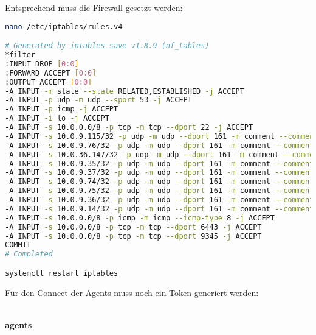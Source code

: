 Entsprechend muss die Firewall gesetzt werden:
\lstset{style=gra_codestyle}
\begin{lstlisting}[language=bash, caption=iptables entries server,captionpos=b,label={lst:iptables-server-entries},breaklines=true]
nano /etc/iptables/rules.v4

# Generated by iptables-save v1.8.9 (nf_tables)
*filter
:INPUT DROP [0:0]
:FORWARD ACCEPT [0:0]
:OUTPUT ACCEPT [0:0]
-A INPUT -m state --state RELATED,ESTABLISHED -j ACCEPT
-A INPUT -p udp -m udp --sport 53 -j ACCEPT
-A INPUT -p icmp -j ACCEPT
-A INPUT -i lo -j ACCEPT
-A INPUT -s 10.0.0.0/8 -p tcp -m tcp --dport 22 -j ACCEPT
-A INPUT -s 10.0.9.115/32 -p udp -m udp --dport 161 -m comment --comment "Allow SNMP for probe 10.0.9.115" -j ACCEPT
-A INPUT -s 10.0.9.76/32 -p udp -m udp --dport 161 -m comment --comment "Allow SNMP for probe 10.0.9.76" -j ACCEPT
-A INPUT -s 10.0.36.147/32 -p udp -m udp --dport 161 -m comment --comment "Allow SNMP for probe 10.0.36.147" -j ACCEPT
-A INPUT -s 10.0.9.35/32 -p udp -m udp --dport 161 -m comment --comment "Allow SNMP for probe 10.0.9.35" -j ACCEPT
-A INPUT -s 10.0.9.37/32 -p udp -m udp --dport 161 -m comment --comment "Allow SNMP for probe 10.0.9.37" -j ACCEPT
-A INPUT -s 10.0.9.74/32 -p udp -m udp --dport 161 -m comment --comment "Allow SNMP for probe 10.0.9.74" -j ACCEPT
-A INPUT -s 10.0.9.75/32 -p udp -m udp --dport 161 -m comment --comment "Allow SNMP for probe 10.0.9.75" -j ACCEPT
-A INPUT -s 10.0.9.36/32 -p udp -m udp --dport 161 -m comment --comment "Allow SNMP for probe 10.0.9.36" -j ACCEPT
-A INPUT -s 10.0.9.14/32 -p udp -m udp --dport 161 -m comment --comment "Allow SNMP for probe 10.0.9.14" -j ACCEPT
-A INPUT -s 10.0.0.0/8 -p icmp -m icmp --icmp-type 8 -j ACCEPT
-A INPUT -s 10.0.0.0/8 -p tcp -m tcp --dport 6443 -j ACCEPT
-A INPUT -s 10.0.0.0/8 -p tcp -m tcp --dport 9345 -j ACCEPT
COMMIT
# Completed

systemctl restart iptables
\end{lstlisting}

Für den Connect der Agents muss noch ein Token generiert werden:
\begin{lstlisting}[language=bash, caption=rke2 server token,captionpos=b,label={lst:rke2-server-token},breaklines=true]
\end{lstlisting}

\paragraph{agents}

